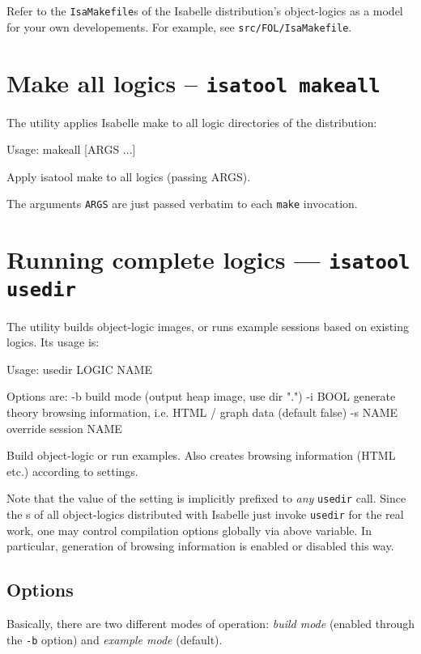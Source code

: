 Refer to the \texttt{IsaMakefile}s of the Isabelle distribution's
object-logics as a model for your own developements.  For example, see
\texttt{src/FOL/IsaMakefile}.


\section{Make all logics -- \texttt{isatool makeall}}

The  utility applies Isabelle make to all logic
directories of the distribution:
\begin{ttbox}
Usage: makeall [ARGS ...]

  Apply isatool make to all logics (passing ARGS).
\end{ttbox}
The arguments \texttt{ARGS} are just passed verbatim to each
\texttt{make} invocation.


\section{Running complete logics --- \texttt{isatool usedir}} \label{sec:tool-usedir}

The  utility builds object-logic images, or runs
example sessions based on existing logics. Its usage is:
\begin{ttbox}
Usage: usedir LOGIC NAME

  Options are:
    -b           build mode (output heap image, use dir ".")
    -i BOOL      generate theory browsing information,
                 i.e. HTML / graph data (default false)
    -s NAME      override session NAME

  Build object-logic or run examples. Also creates browsing
  information (HTML etc.) according to settings.
\end{ttbox}

Note that the value of the  setting is
implicitly prefixed to \emph{any} \texttt{usedir} call. Since the
s of all object-logics distributed with Isabelle
just invoke \texttt{usedir} for the real work, one may control
compilation options globally via above variable. In particular,
generation of  browsing information is enabled or
disabled this way.


\subsection*{Options}

Basically, there are two different modes of operation: \emph{build
  mode} (enabled through the \texttt{-b} option) and \emph{example
  mode} (default).

